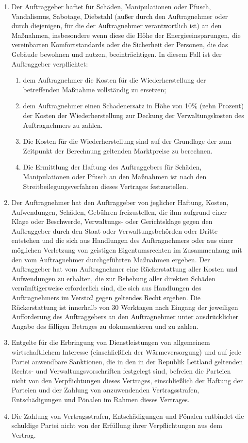\begin{multicols}{2}
\begin{enumerate}
\begin{enumerate}
   \end{enumerate}
   \item Der Auftraggeber haftet für Schäden, Manipulationen oder Pfusch, Vandalismus, Sabotage, Diebstahl (außer durch den Auftragnehmer oder durch diejenigen, für die der Auftragnehmer verantwortlich ist) an den Maßnahmen, insbesondere wenn diese die Höhe der Energieeinsparungen, die vereinbarten Komfortstandards oder die Sicherheit der Personen, die das Gebäude bewohnen und nutzen, beeinträchtigen. In diesem Fall ist der Auftraggeber verpflichtet:
   \begin{enumerate}
   \item dem Auftragnehmer die Kosten für die Wiederherstellung der betreffenden Maßnahme vollständig zu ersetzen;
   \item dem Auftragnehmer einen Schadenersatz in Höhe von 10\% (zehn Prozent) der Kosten der Wiederherstellung zur Deckung der Verwaltungskosten des Auftragnehmers zu zahlen.
   \item Die Kosten für die Wiederherstellung sind auf der Grundlage der zum Zeitpunkt der Berechnung geltenden Marktpreise zu berechnen.
   \item Die Ermittlung der Haftung des Auftraggebers für Schäden, Manipulationen oder Pfusch an den Maßnahmen ist nach den Streitbeilegungsverfahren dieses Vertrages festzustellen.
   \end{enumerate}
   \item Der Auftragnehmer hat den Auftraggeber von jeglicher Haftung, Kosten, Aufwendungen, Schäden, Gebühren freizustellen, die ihm aufgrund einer Klage oder Beschwerde, Verwaltungs- oder Gerichtsklage gegen den Auftraggeber durch den Staat oder Verwaltungsbehörden oder Dritte entstehen und die sich aus Handlungen des Auftragnehmers oder aus einer möglichen Verletzung von geistigen Eigentumsrechten im Zusammenhang mit den vom Auftragnehmer durchgeführten Maßnahmen ergeben. Der Auftraggeber hat vom Auftragnehmer eine Rückerstattung aller Kosten und Aufwendungen zu erhalten, die zur Behebung aller direkten Schäden vernünftigerweise erforderlich sind, die sich aus Handlungen des Auftragnehmers im Verstoß gegen geltendes Recht ergeben. Die Rückerstattung ist innerhalb von 30 Werktagen nach Eingang der jeweiligen Aufforderung des Auftraggebers an den Auftragnehmer unter ausdrücklicher Angabe des fälligen Betrages zu dokumentieren und zu zahlen.
   \item Entgelte für die Erbringung von Dienstleistungen von allgemeinem wirtschaftlichem Interesse (einschließlich der Wärmeversorgung) und auf jede Partei anwendbare Sanktionen, die in den in der Republik Lettland geltenden Rechts- und Verwaltungsvorschriften festgelegt sind, befreien die Parteien nicht von den Verpflichtungen dieses Vertrages, einschließlich der Haftung der Parteien und der Zahlung von anzuwendenden Vertragsstrafen, Entschädigungen und Pönalen im Rahmen dieses Vertrages.
   \item Die Zahlung von Vertragsstrafen, Entschädigungen und Pönalen entbindet die schuldige Partei nicht von der Erfüllung ihrer Verpflichtungen aus dem Vertrag.
   \end{enumerate}


\end{multicols}
